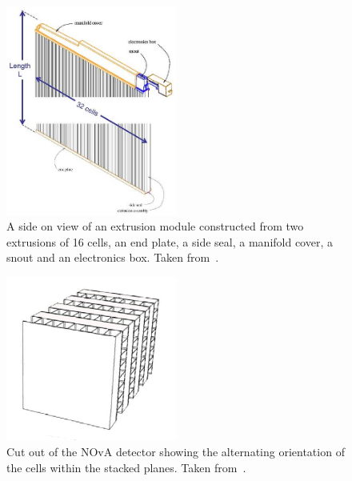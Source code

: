 

\begin{figure}
  \centering
  \includegraphics[width=0.5\textwidth]{../../img/det/gen/extrusionModule.jpg}
  \caption{A side on view of an extrusion module constructed from two
    extrusions of 16 cells, an end plate, a side seal, a manifold cover,
    a snout and an electronics box. Taken from~\cite{TDR}. 
  }
  \label{fig:module}
\end{figure}

\begin{figure}
  \centering
  \includegraphics[width=0.5\textwidth]{../../img/det/gen/planes.png}
  \caption{Cut out of the NOvA detector showing the
    alternating orientation of the cells within the stacked
    planes. Taken from~\cite{TDR}. 
  }
  \label{fig:stackedPlanes}
\end{figure}



